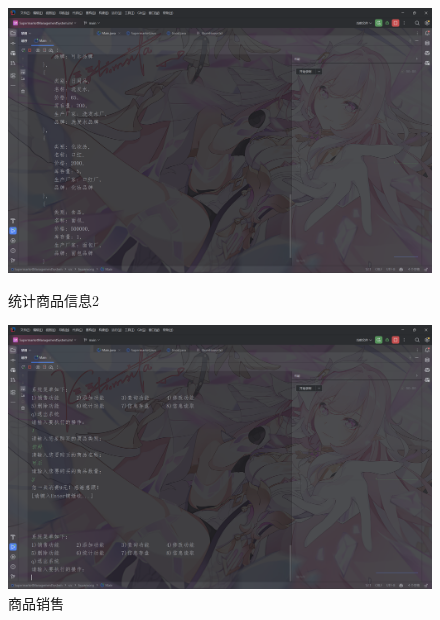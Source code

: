 \documentclass[12pt, a4paper, oneside]{ctexart}
\begin{document}
\begin{figure}[H]
    \begin{minipage}[t]{0.48\textwidth}
        \includegraphics[width=\textwidth]{images/统计商品信息2.png}
        \caption*{统计商品信息2}
    \end{minipage}
    \hfill
    \begin{minipage}[t]{0.48\textwidth}
        \includegraphics[width=\textwidth]{images/商品销售.png}
        \caption*{商品销售}
    \end{minipage}
\end{figure}
\end{document}

